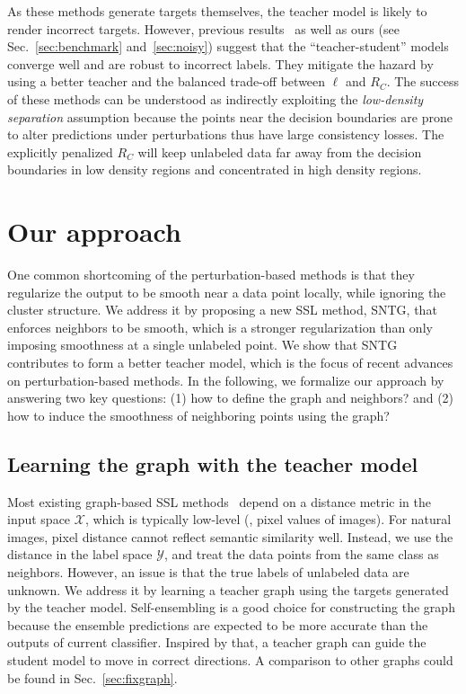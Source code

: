 \documentclass[10pt,twocolumn,letterpaper]{article}
\begin{document}
As these methods generate targets themselves, the teacher model is likely to render incorrect targets. However, previous results~\cite{laine2016temporal,tarvainen2017mean} as well as ours (see Sec.~\ref{sec:benchmark} and~\ref{sec:noisy}) suggest that the ``teacher-student'' models converge well and are robust to incorrect labels. They mitigate the hazard by using a better teacher and the balanced trade-off between $\ell$ and $R_C$. The success of these methods can be understood as indirectly exploiting the \emph{low-density separation} assumption because the points near the decision boundaries are prone to alter predictions under perturbations thus have large consistency losses. The explicitly penalized $R_C$ will keep unlabeled data far away from the decision boundaries in low density regions and concentrated in high density regions.

\section{Our approach}
\label{sec:approach}
One common shortcoming of the perturbation-based methods is that they regularize the output to be smooth near a data point locally, while ignoring the cluster structure. We address it by proposing a new SSL method, SNTG, that enforces neighbors to be smooth, which is a stronger regularization than only imposing smoothness at a single unlabeled point.
We show that SNTG contributes to form a better teacher model, which is the focus of recent advances on perturbation-based methods.
In the following, we formalize our approach by answering two key questions: (1) how to define the graph and neighbors? and (2) how to induce the smoothness of neighboring points using the graph?

\subsection{Learning the graph with the teacher model}
\label{sec:graph}
Most existing graph-based SSL methods~\cite{belkin2006manifold,weston2008deep} depend on a distance metric in the input space $\mathcal{X}$, which is typically low-level (\eg, pixel values of images). For natural images, pixel distance cannot reflect semantic similarity well. Instead, we use the distance in the label space $\mathcal{Y}$, and treat the data points from the same class as neighbors. However, an issue is that the true labels of unlabeled data are unknown.
We address it by learning a teacher graph using the targets generated by the teacher model.
Self-ensembling is a good choice for constructing the graph because the ensemble predictions are expected to be more accurate than the outputs of current classifier.
Inspired by that, a teacher graph can guide the student model to move in correct directions. A comparison
to
other graphs could be found in Sec.~\ref{sec:fixgraph}.
\end{document}
